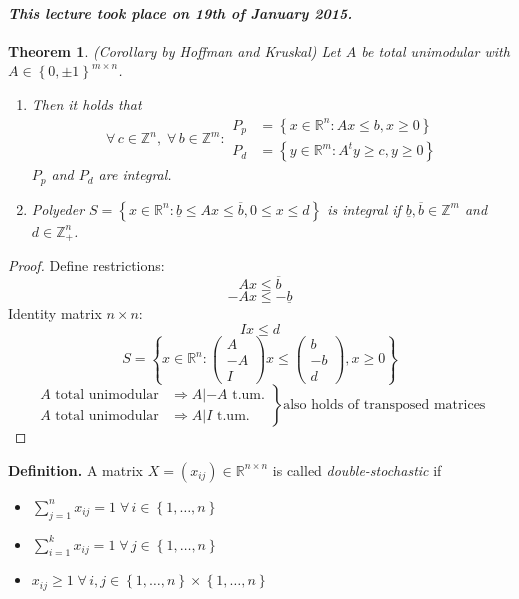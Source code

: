 \documentclass{article}
\newtheorem{theorem}{Theorem}
\newcommand{\set}[1]{\left\{#1\right\}}
\newcommand{\dateref}[1]{\paragraph{\textit{This lecture took place on #1.}}}
\newcommand{\fall}{\;\forall\,}
\begin{document}
\dateref{19th of January 2015}

\begin{theorem}
  (Corollary by Hoffman and Kruskal)
  Let $A$ be total unimodular with $A \in \set{0, \pm 1}^{m \times n}$.
  \begin{enumerate}
    \item Then it holds that
      \[
        \fall c \in \mathbb{Z}^n, \fall b \in \mathbb{Z}^m:
          \begin{array}{rl}
            P_p &= \set{x \in \mathbb{R}^n: Ax \leq b, x \geq 0} \\
            P_d &= \set{y \in \mathbb{R}^m: A^t y \geq c, y \geq 0}
          \end{array}
      \]
      $P_p$ and $P_d$ are integral.
    \item Polyeder $S = \set{x \in \mathbb{R}^n: \underline{b} \leq Ax \leq \overline{b}, 0 \leq x \leq d}$
      is integral if $\underline{b}, \overline{b} \in \mathbb{Z}^m$ and $d \in \mathbb{Z}_+^n$.
  \end{enumerate}
\end{theorem}

\begin{proof}
  Define restrictions:
  \[ Ax \leq \overline{b} \]
  \[ -Ax \leq -\underline{b} \]
  Identity matrix $n \times n$:
  \[ Ix \leq d \]
  \[
    S = \set{
      x \in \mathbb{R}^n:
        \begin{pmatrix} A \\ -A \\ I\end{pmatrix} x \leq
        \begin{pmatrix} b \\ -b \\ d\end{pmatrix}, x \geq 0
    }
  \] \[
    \left.\begin{array}{ll}
      A \text{ total unimodular} &\Rightarrow A | -A \text{ t.um.} \\
      A \text{ total unimodular} &\Rightarrow A | I \text{ t.um.}
    \end{array}\right\}
    \text{also holds of transposed matrices}
  \]
\end{proof}

\textbf{Definition.}
  A matrix $X = (x_{ij}) \in \mathbb{R}^{n \times n}$ is called \emph{double-stochastic} if
  \begin{itemize}
    \item $\sum_{j=1}^n x_{ij} = 1 \fall i \in \set{1, \ldots, n}$
    \item $\sum_{i=1}^k x_{ij} = 1 \fall j \in \set{1, \ldots, n}$
    \item $x_{ij} \geq 1 \fall i,j \in \set{1, \ldots, n} \times \set{1, \ldots, n}$
  \end{itemize}
\end{document}
